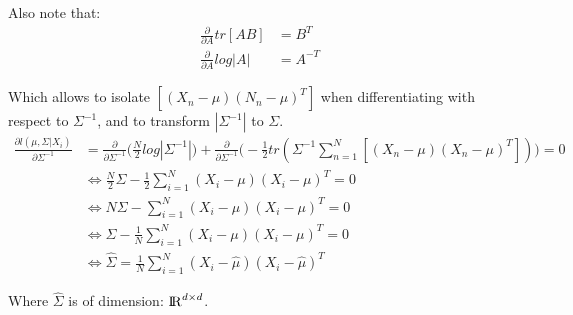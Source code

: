 \documentclass{amsart}
\theoremstyle{definition}
\theoremstyle{remark}
\numberwithin{equation}{section}
\begin{document}
Also note that:\\

\begin{equation}
    \begin{align}
    \frac{\partial}{\partial A} tr[AB] & = B^T \\
    \frac{\partial}{\partial A} log|A| & = A^{-T}
    \end{align}
\end{equation}

Which allows to isolate $[(X_n-\mu)(N_n-\mu)^T]$ when differentiating with 
respect to $\Sigma^{-1}$, and to transform $|\Sigma^{-1}|$ to $\Sigma$. \\

\begin{equation}
    \begin{align}
    \frac{\partial l(\mu, \Sigma|X_i)}{\partial\Sigma^{-1}} & = 
        \frac{\partial}{\partial\Sigma^{-1}}\big(\frac{N}{2}log|\Sigma^{-1}|\big) + 
        \frac{\partial}{\partial\Sigma^{-1}}\big(-\frac{1}{2}tr(\Sigma^{-1}\sum_{n=1}^{N}[(X_n-\mu)(X_n-\mu)^T])\big) = 0 \\
    & \Leftrightarrow \frac{N}{2} \Sigma -\frac{1}{2}\sum_{i=1}^{N}(X_i-\mu)(X_i-\mu)^T = 0 \\
    & \Leftrightarrow N\Sigma - \sum_{i=1}^{N}(X_i-\mu)(X_i-\mu)^T = 0 \\
    & \Leftrightarrow \Sigma - \frac{1}{N}\sum_{i=1}^{N}(X_i-\mu)(X_i-\mu)^T = 0 \\
    & \Leftrightarrow \hat\Sigma = \frac{1}{N}\sum_{i=1}^{N}(X_i-\hat\mu)(X_i-\hat\mu)^T 
    \end{align}
\end{equation}

Where $\hat\Sigma$ is of dimension: ${\rm I\!R}^{d \times d}$. 
\end{document}
